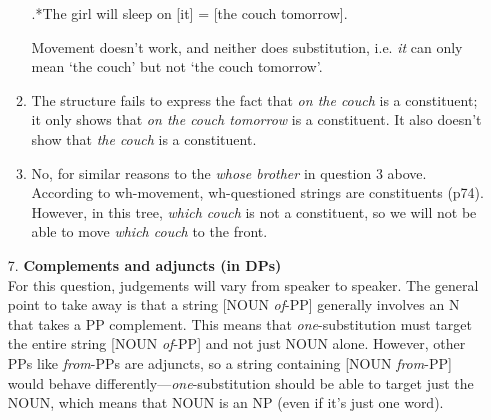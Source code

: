 \documentclass[a4paper,12pt]{article}
\begin{document}
\begin{enumerate}
\begin{enumerate}[label=(\roman*)]
            \ex.*The girl will sleep on [it] = [the couch tomorrow].

            Movement doesn't work, and neither does substitution, i.e. \textit{it} can only mean `the couch' but not `the couch tomorrow'.

            \item The structure fails to express the fact that \textit{on the couch} is a constituent; it only shows that \textit{on the couch tomorrow} is a constituent. It also doesn't show that \textit{the couch} is a constituent.

            \item No, for similar reasons to the \textit{whose brother} in question 3 above. According to wh-movement, wh-questioned strings are constituents (p74). However, in this tree, \textit{which couch} is not a constituent, so we will not be able to move \textit{which couch} to the front.

        \end{enumerate}

\newpage
    \item[7.] \textbf{Complements and adjuncts (in DPs)}\\
        For this question, judgements will vary from speaker to speaker. The general point to take away is that a string [NOUN \textit{of}-PP] generally involves an N that takes a PP complement. This means that \textit{one}-substitution must target the entire string [NOUN \textit{of}-PP] and not just NOUN alone. However, other PPs like \textit{from}-PPs are adjuncts, so a string containing [NOUN \textit{from}-PP] would behave differently---\textit{one}-substitution should be able to target just the NOUN, which means that NOUN is an NP (even if it's just one word).
    \setcounter{ExNo}{0}


\end{enumerate}
\end{document}
